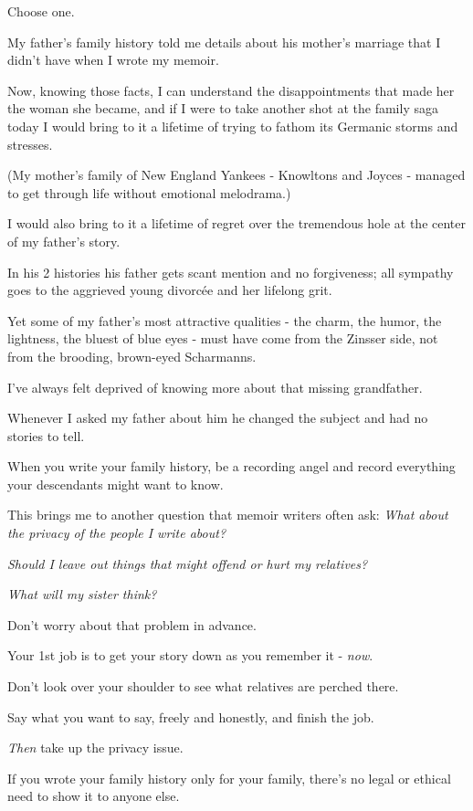 \documentclass{book}
\numberwithin{equation}{section}
\begin{document}
Choose one.

%
My father's family history told me details about his mother's marriage that I didn't have when I wrote my memoir.

Now, knowing those facts, I can understand the disappointments that made her the woman she became, and if I were to take another shot at the family saga today I would bring to it a lifetime of trying to fathom its Germanic storms and stresses.

(My mother's family of New England Yankees - Knowltons and Joyces - managed to get through life without emotional melodrama.)

I would also bring to it a lifetime of regret over the tremendous hole at the center of my father's story.

In his 2 histories his father gets scant mention and no forgiveness; all sympathy goes to the aggrieved young divorc\'ee and her lifelong grit.

%
Yet some of my father's most attractive qualities - the charm, the humor, the lightness, the bluest of blue eyes - must have come from the Zinsser side, not from the brooding, brown-eyed Scharmanns.

I've always felt deprived of knowing more about that missing grandfather.

Whenever I asked my father about him he changed the subject and had no stories to tell.

When you write your family history, be a recording angel and record everything your descendants might want to know.

%
This brings me to another question that memoir writers often ask: \textit{What about the privacy of the people I write about?}

\textit{Should I leave out things that might offend or hurt my relatives?}

\textit{What will my sister think?}

%
Don't worry about that problem in advance.

Your 1st job is to get your story down as you remember it - \textit{now}.

Don't look over your shoulder to see what relatives are perched there.

Say what you want to say, freely and honestly, and finish the job.

\textit{Then} take up the privacy issue.

If you wrote your family history only for your family, there's no legal or ethical need to show it to anyone else.
\end{document}
